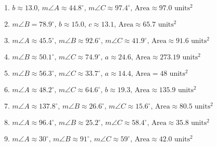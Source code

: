 \begin{enumerate}
	\item $b \approx 13.0, \, m\angle A \approx 44.8^\circ, \, m\angle C \approx 97.4^\circ, \, \text{Area} \approx 97.0 \text{ units}^2$
	\item $m \angle B = 78.9^\circ, \, b \approx 15.0, \, c \approx 13.1, \, \text{Area} \approx 65.7 \text{ units}^2$
	\item $m\angle A \approx 45.5^\circ, \, m\angle B \approx 92.6^\circ, \, m\angle C \approx 41.9^\circ, \, \text{Area} \approx 91.6 \text{ units}^2$
	
	\item $m\angle B \approx 50.1^\circ, \, m\angle C \approx 74.9^\circ, \, a \approx 24.6, \, \text{Area} \approx 273.19 \text{ units}^2$
	\item $m\angle B \approx 56.3^\circ, \, m\angle C \approx 33.7^\circ, \, a \approx 14.4, \, \text{Area} = 48 \text{ units}^2$
	\item $m\angle A \approx 48.2^\circ, \, m\angle C \approx 64.6^\circ, \, b \approx 19.3, \, \text{Area} \approx 135.9 \text{ units}^2$
	
	\item $m\angle A \approx 137.8^\circ, \, m\angle B \approx 26.6^\circ, \, m\angle C \approx 15.6^\circ, \, \text{Area} \approx 80.5 \text{ units}^2$
	\item $m\angle A \approx 96.4^\circ, \, m\angle B \approx 25.2^\circ, \, m\angle C \approx 58.4^\circ, \, \text{Area} \approx 35.8 \text{ units}^2$
	\item $m\angle A \approx 30^\circ, \, m\angle B \approx 91^\circ, \, m\angle C \approx 59^\circ, \, \text{Area} \approx 42.0 \text{ units}^2$
	
\end{enumerate}